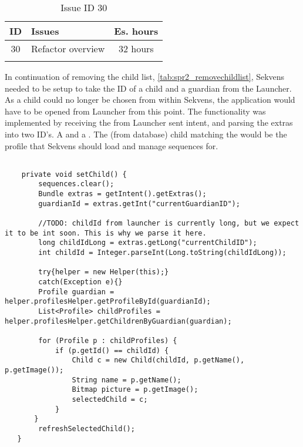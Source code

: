 \begin{longtable} { | c | p{12cm} | c | } 
\hline
	ID 	&	Issues	&		 Es. hours \\\hline
	30 	&	Refactor overview	&	32 hours \\\hline
\caption{Issue ID 30}
\label{tab:spr2_refactoroverview}
\end{longtable}

In continuation of removing the child list, \ref{tab:spr2_removechildlist}, Sekvens needed to be setup to take the ID of a child and a guardian from the Launcher. As a child could no longer be chosen from within Sekvens, the application would have to be opened from Launcher from this point. The functionality was implemented by receiving the from Launcher sent intent, and parsing the extras into two ID's. A  and a . The (from database) child matching the  would be the profile that Sekvens should load and manage sequences for.

\begin{lstlisting}[caption={A small code example of fetching the intents from Launcher}, label={lst:fetchIntent}]
    
	private void setChild() {
		sequences.clear();
		Bundle extras = getIntent().getExtras();
        guardianId = extras.getInt("currentGuardianID");

        //TODO: childId from launcher is currently long, but we expect it to be int soon. This is why we parse it here.
        long childIdLong = extras.getLong("currentChildID");
        int childId = Integer.parseInt(Long.toString(childIdLong));

        try{helper = new Helper(this);}
        catch(Exception e){}
   		Profile guardian = helper.profilesHelper.getProfileById(guardianId);
   		List<Profile> childProfiles = helper.profilesHelper.getChildrenByGuardian(guardian);

    	for (Profile p : childProfiles) {
    		if (p.getId() == childId) {
                Child c = new Child(childId, p.getName(), p.getImage());
                String name = p.getName();
                Bitmap picture = p.getImage();
                selectedChild = c;
            }
       }
        refreshSelectedChild();
   }

\end{lstlisting}